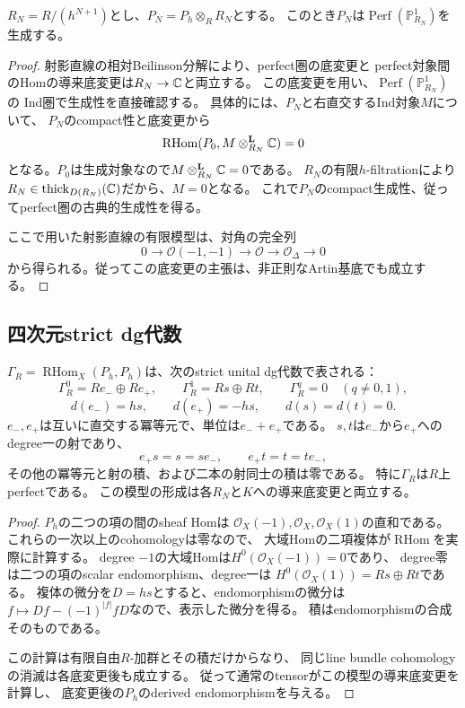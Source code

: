 \begin{lemma}[各有限切断では生成する]\label{as:lem:artin-generation}
$R_N=R/(h^{N+1})$とし、$P_N=P_h\otimes_RR_N$とする。
このとき$P_N$は$\operatorname{Perf}(\mathbb P^1_{R_N})$を生成する。
\end{lemma}
\begin{proof}
射影直線の相対Beilinson分解により、perfect圏の底変更と
perfect対象間のHomの導来底変更は$R_N\to\mathbb C$と両立する。
この底変更を用い、$\operatorname{Perf}(\mathbb P^1_{R_N})$の
Ind圏で生成性を直接確認する。
具体的には、$P_N$と右直交するInd対象$M$について、
$P_N$のcompact性と底変更から
\[
 \operatorname{RHom}(P_0,M\otimes_{R_N}^{\mathbf L}\mathbb C)=0
\]
となる。$P_0$は生成対象なので$M\otimes_{R_N}^{\mathbf L}\mathbb C=0$である。
$R_N$の有限$h$-filtrationにより
$R_N\in\operatorname{thick}_{D(R_N)}(\mathbb C)$だから、$M=0$となる。
これで$P_N$のcompact生成性、従ってperfect圏の古典的生成性を得る。

ここで用いた射影直線の有限模型は、対角の完全列
\[
 0\longrightarrow\mathcal O(-1,-1)
 \longrightarrow\mathcal O
 \longrightarrow\mathcal O_\Delta\longrightarrow0
\]
から得られる。従ってこの底変更の主張は、非正則なArtin基底でも成立する。
\end{proof}

\subsection{四次元strict dg代数}

\begin{proposition}[底上properな明示的dg模型]\label{as:prop:dg-model}
$\Gamma_R=\operatorname{RHom}_X(P_h,P_h)$は、次のstrict unital dg代数で表される：
\begin{equation}\label{as:eq:dg-algebra}
 \Gamma_R^0=Re_-\oplus Re_+,\qquad
 \Gamma_R^1=Rs\oplus Rt,\qquad
 \Gamma_R^q=0\quad(q\ne0,1),
\end{equation}
\[
 d(e_-)=hs,\qquad d(e_+)=-hs,\qquad d(s)=d(t)=0.
\]
$e_-,e_+$は互いに直交する冪等元で、単位は$e_-+e_+$である。
$s,t$は$e_-$から$e_+$へのdegree一の射であり、
\[
 e_+s=s=se_-,\qquad e_+t=t=te_-,
\]
その他の冪等元と射の積、および二本の射同士の積は零である。
特に$\Gamma_R$は$R$上perfectである。
この模型の形成は各$R_N$と$K$への導来底変更と両立する。
\end{proposition}
\begin{proof}
$P_h$の二つの項の間のsheaf Homは
$\mathcal O_X(-1),\mathcal O_X,\mathcal O_X(1)$の直和である。
これらの一次以上のcohomologyは零なので、
大域Homの二項複体が$\operatorname{RHom}$を実際に計算する。
degree $-1$の大域Homは$H^0(\mathcal O_X(-1))=0$であり、
degree零は二つの項のscalar endomorphism、degree一は
$H^0(\mathcal O_X(1))=Rs\oplus Rt$である。
複体の微分を$D=hs$とすると、endomorphismの微分は
$f\mapsto Df-(-1)^{|f|}fD$なので、表示した微分を得る。
積はendomorphismの合成そのものである。

この計算は有限自由$R$-加群とその積だけからなり、
同じline bundle cohomologyの消滅は各底変更後も成立する。
従って通常のtensorがこの模型の導来底変更を計算し、
底変更後の$P_h$のderived endomorphismを与える。
\end{proof}

